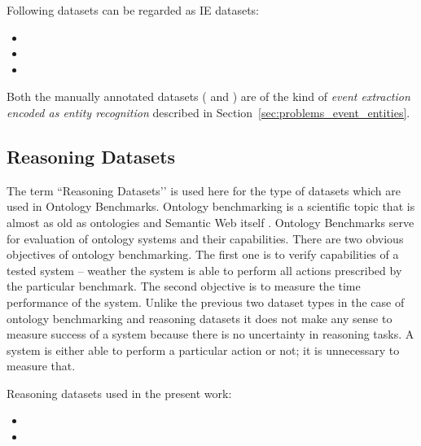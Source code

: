 Following datasets can be regarded as IE datasets:

\begin{itemize}
	\item {}
	\item {}
	\item {}
\end{itemize}

Both the manually annotated datasets ( and ) are of the kind of \emph{event extraction encoded as entity recognition} described in Section~\ref{sec:problems_event_entities}.


\subsection{Reasoning Datasets}


The term ``Reasoning Datasets’’ is used here for the type of datasets which are used in Ontology Benchmarks. Ontology benchmarking is a scientific topic that is almost as old as ontologies and Semantic Web itself \citep{DBLP:conf/semweb/GuoHP03}. Ontology Benchmarks serve for evaluation of ontology systems and their capabilities. There are two obvious objectives of ontology benchmarking. The first one is to verify capabilities of a tested system -- weather the system is able to perform all actions prescribed by the particular benchmark. The second objective is to measure the time performance of the system. Unlike the previous two dataset types in the case of ontology benchmarking and reasoning datasets it does not make any sense to measure success of a system because there is no uncertainty in reasoning tasks. A system is either able to perform a particular action or not; it is unnecessary to measure that. 

Reasoning datasets used in the present work:
\begin{itemize}
	\item {}
	\item {}
\end{itemize}

